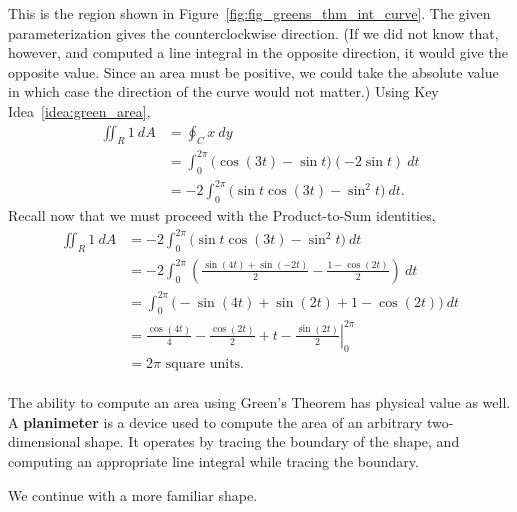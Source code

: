  {This is the region shown in Figure~\ref{fig:fig_greens_thm_int_curve}.  The given parameterization gives the counterclockwise direction.  (If we did not know that, however, and computed a line integral in the opposite direction, it would give the opposite value.  Since an area must be positive, we could take the absolute value in which case the direction of the curve would not matter.)  Using Key Idea~\ref{idea:green_area},
\begin{align*}
\iint_R 1\ dA &= \oint_C x\: dy\\
&= \int_0^{2\pi} \big( \cos(3t) - \sin t \big) (-2\sin t)\ dt\\
&=-2 \int_0^{2\pi} \big( \sin t \cos(3t) - \sin^2 t \big)\ dt.
\end{align*}
Recall now that we must proceed with the Product-to-Sum identities,
\begin{align*}
\iint_R 1\ dA &= -2 \int_0^{2\pi} \big( \sin t \cos(3t) - \sin^2 t \big)\ dt\\
&=-2 \int_0^{2\pi} \left(  \frac{\sin(4t) + \sin(-2t)}{2} - \frac{1-\cos(2t)}{2}   \right)\ dt\\
&= \int_0^{2\pi} \big(  -\sin(4t) +\sin (2t) + 1 - \cos(2t)  \big)\ dt\\
&= \left. \frac{\cos(4t)}{4} - \frac{\cos(2t)}{2} + t - \frac{\sin(2t)}{2}\right|_0^{2\pi}\\
&=2\pi \text{ square units.}
\end{align*}
}\\

The ability to compute an area using Green's Theorem has physical value as well.  A \textbf{planimeter} is a device used to compute the area of an arbitrary two-dimensional shape.  It operates by tracing the boundary of the shape, and computing an appropriate line integral while tracing the boundary.

We continue with a more familiar shape.

